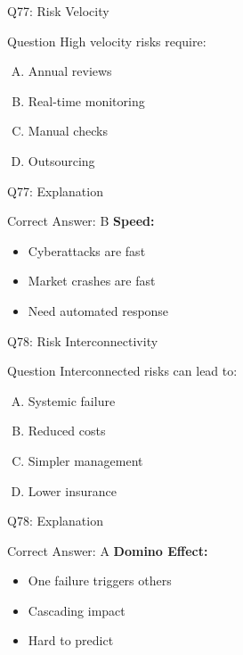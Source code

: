 \documentclass{beamer}
\begin{document}
			\begin{frame}{Q77: Risk Velocity}
				\begin{block}{Question}
					High velocity risks require:
				\end{block}
				\begin{enumerate}[(A)]
					\item Annual reviews
					\item Real-time monitoring
					\item Manual checks
					\item Outsourcing
				\end{enumerate}
			\end{frame}
			\begin{frame}{Q77: Explanation}
				\begin{block}{Correct Answer: B}
					\textbf{Speed:}
					\begin{itemize}
						\item Cyberattacks are fast
						\item Market crashes are fast
						\item Need automated response
					\end{itemize}
				\end{block}
			\end{frame}
			
			\begin{frame}{Q78: Risk Interconnectivity}
				\begin{block}{Question}
					Interconnected risks can lead to:
				\end{block}
				\begin{enumerate}[(A)]
					\item Systemic failure
					\item Reduced costs
					\item Simpler management
					\item Lower insurance
				\end{enumerate}
			\end{frame}
			\begin{frame}{Q78: Explanation}
				\begin{block}{Correct Answer: A}
					\textbf{Domino Effect:}
					\begin{itemize}
						\item One failure triggers others
						\item Cascading impact
						\item Hard to predict
					\end{itemize}
				\end{block}
			\end{frame}
			
\end{document}
